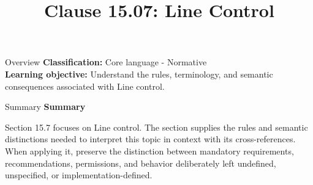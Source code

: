 \documentclass[10pt,letterpaper]{article}
\title{Clause 15.07: Line Control}
\author{}
\date{}
\begin{document}
\maketitle
\begin{CornellOverviewBox}{Overview}
\textbf{Classification:} Core language - Normative\\[2pt]
\textbf{Learning objective:} Understand the rules, terminology, and semantic consequences associated with Line control.
\end{CornellOverviewBox}\begin{CornellSummaryBox}{Summary}
{\sffamily\bfseries\color{Accent} Summary}\par\vspace{3pt}Section 15.7 focuses on Line control. The section supplies the rules and semantic distinctions needed to interpret this topic in context with its cross-references. When applying it, preserve the distinction between mandatory requirements, recommendations, permissions, and behavior deliberately left undefined, unspecified, or implementation-defined.
\end{CornellSummaryBox}
\end{document}
